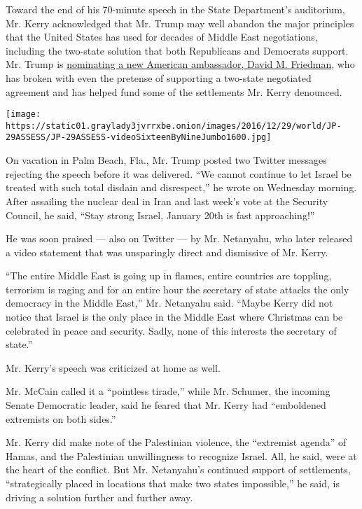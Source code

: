 Toward the end of his 70-minute speech in the State Department's
auditorium, Mr. Kerry acknowledged that Mr. Trump may well abandon the
major principles that the United States has used for decades of Middle
East negotiations, including the two-state solution that both
Republicans and Democrats support. Mr. Trump is
\href{https://www.nytimes3xbfgragh.onion/2016/12/16/world/middleeast/david\%2Dfriedman\%2Dus\%2Dambassador\%2Disrael.html?_r=0}{nominating
a new American ambassador, David M. Friedman}, who has broken with even
the pretense of supporting a two-state negotiated agreement and has
helped fund some of the settlements Mr. Kerry denounced.

\texttt{[image: https://static01.graylady3jvrrxbe.onion/images/2016/12/29/world/JP-29ASSESS/JP-29ASSESS-videoSixteenByNineJumbo1600.jpg]}

On vacation in Palm Beach, Fla., Mr. Trump posted two Twitter messages
rejecting the speech before it was delivered. ``We cannot continue to
let Israel be treated with such total disdain and disrespect,'' he wrote
on Wednesday morning. After assailing the nuclear deal in Iran and last
week's vote at the Security Council, he said, ``Stay strong Israel,
January 20th is fast approaching!''

He was soon praised --- also on Twitter --- by Mr. Netanyahu, who later
released a video statement that was unsparingly direct and dismissive of
Mr. Kerry.

``The entire Middle East is going up in flames, entire countries are
toppling, terrorism is raging and for an entire hour the secretary of
state attacks the only democracy in the Middle East,'' Mr. Netanyahu
said. ``Maybe Kerry did not notice that Israel is the only place in the
Middle East where Christmas can be celebrated in peace and security.
Sadly, none of this interests the secretary of state.''

Mr. Kerry's speech was criticized at home as well.

Mr. McCain called it a ``pointless tirade,'' while Mr. Schumer, the
incoming Senate Democratic leader, said he feared that Mr. Kerry had
``emboldened extremists on both sides.''

Mr. Kerry did make note of the Palestinian violence, the ``extremist
agenda'' of Hamas, and the Palestinian unwillingness to recognize
Israel. All, he said, were at the heart of the conflict. But Mr.
Netanyahu's continued support of settlements, ``strategically placed in
locations that make two states impossible,'' he said, is driving a
solution further and further away.

